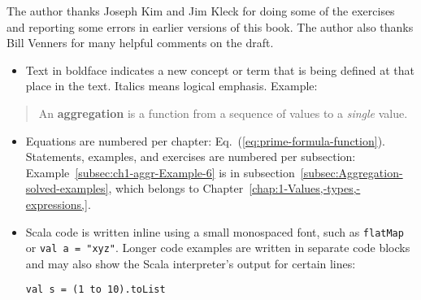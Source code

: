 The author thanks Joseph Kim and Jim Kleck for doing some of the exercises
and reporting some errors in earlier versions of this book. The author
also thanks Bill Venners for many helpful comments on the draft.

\begin{itemize}
\item Text in boldface indicates a new concept or term that is being defined
at that place in the text. Italics means logical emphasis. Example:
\end{itemize}
\begin{quotation}
An \textbf{aggregation} is a function from a sequence
of values to a \emph{single} value.
\end{quotation}
\begin{itemize}
\item Equations are numbered per chapter: Eq.~(\ref{eq:prime-formula-function}).
Statements, examples, and exercises are numbered per subsection: Example~\ref{subsec:ch1-aggr-Example-6}
is in subsection~\ref{subsec:Aggregation-solved-examples}, which
belongs to Chapter~\ref{chap:1-Values,-types,-expressions,}.
\item Scala code is written inline using a small monospaced font, such as
\lstinline!flatMap! or \lstinline!val a = "xyz"!. Longer code examples
are written in separate code blocks and may also show the Scala interpreter\textsf{'}s
output for certain lines:
\begin{lstlisting}[mathescape=true]
val s = (1 to 10).toList


\end{lstlisting}
\end{itemize}
